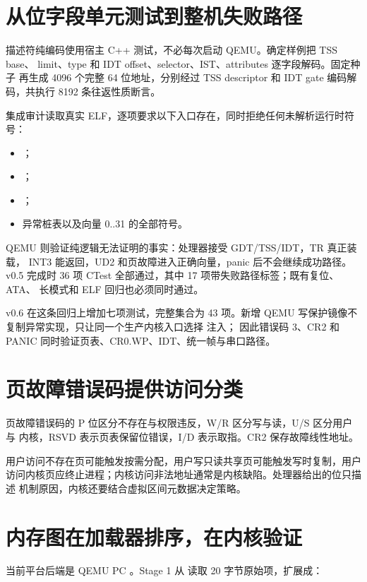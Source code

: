 \section{从位字段单元测试到整机失败路径}

描述符纯编码使用宿主 C++ 测试，不必每次启动 QEMU。确定样例把 TSS base、
limit、type 和 IDT offset、selector、IST、attributes 逐字段解码。固定种子
 再生成 4096 个完整 64 位地址，分别经过 TSS
descriptor 和 IDT gate 编码解码，共执行 8192 条往返性质断言。

集成审计读取真实 ELF，逐项要求以下入口存在，同时拒绝任何未解析运行时符号：
\begin{itemize}
  \item {}；
  \item {}；
  \item {}；
  \item 异常桩表以及向量 0..31 的全部符号。
\end{itemize}

QEMU 则验证纯逻辑无法证明的事实：处理器接受 GDT/TSS/IDT，TR 真正装载，
INT3 能返回，UD2 和页故障进入正确向量，panic 后不会继续成功路径。v0.5
完成时 36 项 CTest 全部通过，其中 17 项带失败路径标签；既有复位、ATA、
长模式和 ELF 回归也必须同时通过。

v0.6 在这条回归上增加七项测试，完整集合为 43 项。新增 QEMU 写保护镜像不
复制异常实现，只让同一个生产内核入口选择  注入；
因此错误码 3、CR2 和 PANIC 同时验证页表、CR0.WP、IDT、统一帧与串口路径。

\section{页故障错误码提供访问分类}

页故障错误码的 P 位区分不存在与权限违反，W/R 区分写与读，U/S 区分用户与
内核，RSVD 表示页表保留位错误，I/D 表示取指。CR2 保存故障线性地址。

用户访问不存在页可能触发按需分配，用户写只读共享页可能触发写时复制，用户
访问内核页应终止进程；内核访问非法地址通常是内核缺陷。处理器给出的位只描述
机制原因，内核还要结合虚拟区间元数据决定策略。

\section{内存图在加载器排序，在内核验证}

当前平台后端是 QEMU PC 。Stage 1 从
 读取 20 字节原始项，扩展成：

